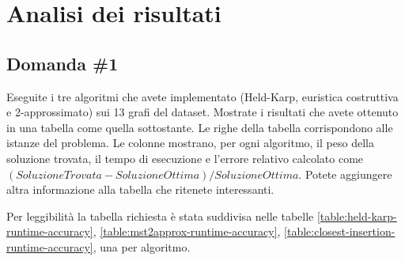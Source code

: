 \section{Analisi dei risultati}
\label{cap:performance-analysis}

\subsection{Domanda \#1}
\label{sec:question-1}

\begin{displayquote}
Eseguite i tre algoritmi che avete implementato (Held-Karp,
euristica costruttiva e 2-approssimato) sui 13 grafi del dataset.
Mostrate i risultati che avete ottenuto in una tabella come quella
sottostante. Le righe della tabella corrispondono alle istanze del
problema. Le colonne mostrano, per ogni algoritmo, il peso della
soluzione trovata, il tempo di esecuzione e l'errore relativo
calcolato come $(SoluzioneTrovata-SoluzioneOttima)/SoluzioneOttima$.
Potete aggiungere altra informazione alla tabella che ritenete
interessanti.
\end{displayquote}

\noindent Per leggibilità la tabella richiesta è stata suddivisa nelle
tabelle
\ref{table:held-karp-runtime-accuracy},
\ref{table:mst2approx-runtime-accuracy},
\ref{table:closest-insertion-runtime-accuracy},
una per algoritmo.


